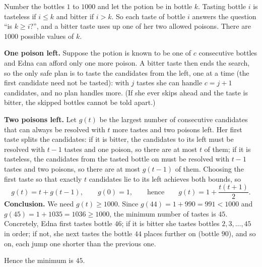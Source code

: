 Number the bottles $1$ to $1000$ and let the potion be in bottle $k$. Tasting bottle $i$ is tasteless if $i\le k$ and bitter if $i>k$. So each taste of bottle $i$ answers the question ``is $k\ge i$?'', and a bitter taste uses up one of her two allowed poisons. There are $1000$ possible values of $k$.

\textbf{One poison left.} Suppose the potion is known to be one of $c$ consecutive bottles and Edna can afford only one more poison. A bitter taste then ends the search, so the only safe plan is to taste the candidates from the left, one at a time (the first candidate need not be tasted): with $j$ tastes she can handle $c=j+1$ candidates, and no plan handles more. (If she ever skips ahead and the taste is bitter, the skipped bottles cannot be told apart.)

\textbf{Two poisons left.} Let $g(t)$ be the largest number of consecutive candidates that can always be resolved with $t$ more tastes and two poisons left. Her first taste splits the candidates: if it is bitter, the candidates to its left must be resolved with $t-1$ tastes and one poison, so there are at most $t$ of them; if it is tasteless, the candidates from the tasted bottle on must be resolved with $t-1$ tastes and two poisons, so there are at most $g(t-1)$ of them. Choosing the first taste so that exactly $t$ candidates lie to its left achieves both bounds, so
\[
g(t)=t+g(t-1),\qquad g(0)=1,\qquad\text{hence}\qquad g(t)=1+\dfrac{t(t+1)}{2}.
\]
\textbf{Conclusion.} We need $g(t)\ge1000$. Since $g(44)=1+990=991<1000$ and $g(45)=1+1035=1036\ge1000$, the minimum number of tastes is $45$. Concretely, Edna first tastes bottle $46$; if it is bitter she tastes bottles $2,3,\dots,45$ in order; if not, she next tastes the bottle $44$ places further on (bottle $90$), and so on, each jump one shorter than the previous one.

Hence the minimum is $\boxed{45}$.
